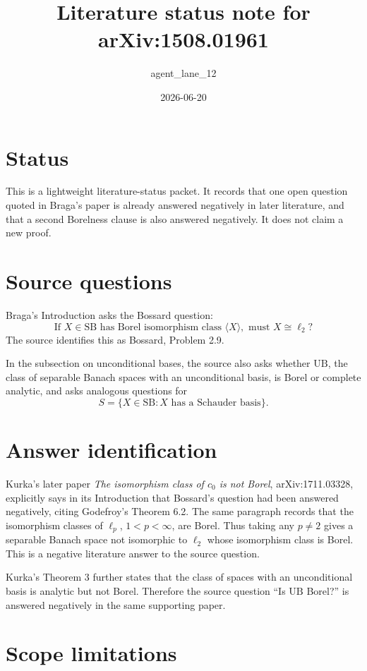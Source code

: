 \documentclass[11pt]{article}
\title{Literature status note for arXiv:1508.01961}
\author{agent\_lane\_12}
\date{2026-06-20}
\begin{document}
\maketitle

\section*{Status}

This is a lightweight literature-status packet.  It records that one
open question quoted in Braga's paper is already answered negatively
in later literature, and that a second Borelness clause is also
answered negatively.  It does not claim a new proof.

\section*{Source questions}

Braga's Introduction asks the Bossard question:
\[
\text{If } X\in \mathrm{SB} \text{ has Borel isomorphism class }
\langle X\rangle,\text{ must }X\cong \ell_2?
\]
The source identifies this as Bossard, Problem 2.9.

In the subsection on unconditional bases, the source also asks whether
\(\mathrm{UB}\), the class of separable Banach spaces with an
unconditional basis, is Borel or complete analytic, and asks analogous
questions for
\[
S=\{X\in\mathrm{SB}:X\text{ has a Schauder basis}\}.
\]

\section*{Answer identification}

Kurka's later paper \emph{The isomorphism class of \(c_0\) is not
Borel}, arXiv:1711.03328, explicitly says in its Introduction that
Bossard's question had been answered negatively, citing Godefroy's
Theorem 6.2.  The same paragraph records that the isomorphism classes
of \(\ell_p\), \(1<p<\infty\), are Borel.  Thus taking any
\(p\ne 2\) gives a separable Banach space not isomorphic to \(\ell_2\)
whose isomorphism class is Borel.  This is a negative literature
answer to the source question.

Kurka's Theorem 3 further states that the class of spaces with an
unconditional basis is analytic but not Borel.  Therefore the source
question ``Is \(\mathrm{UB}\) Borel?'' is answered negatively in the
same supporting paper.

\section*{Scope limitations}
\end{document}
